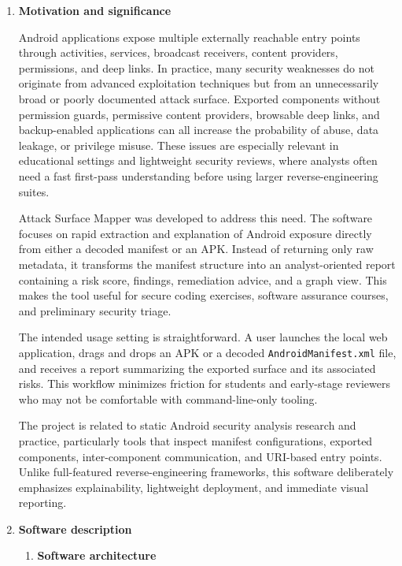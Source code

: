 \documentclass[preprint,12pt,a4paper]{elsarticle}
\begin{document}
\begin{enumerate}

\item \textbf{Motivation and significance}

Android applications expose multiple externally reachable entry points through activities, services, broadcast receivers, content providers, permissions, and deep links. In practice, many security weaknesses do not originate from advanced exploitation techniques but from an unnecessarily broad or poorly documented attack surface. Exported components without permission guards, permissive content providers, browsable deep links, and backup-enabled applications can all increase the probability of abuse, data leakage, or privilege misuse. These issues are especially relevant in educational settings and lightweight security reviews, where analysts often need a fast first-pass understanding before using larger reverse-engineering suites.

Attack Surface Mapper was developed to address this need. The software focuses on rapid extraction and explanation of Android exposure directly from either a decoded manifest or an APK. Instead of returning only raw metadata, it transforms the manifest structure into an analyst-oriented report containing a risk score, findings, remediation advice, and a graph view. This makes the tool useful for secure coding exercises, software assurance courses, and preliminary security triage.

The intended usage setting is straightforward. A user launches the local web application, drags and drops an APK or a decoded \texttt{AndroidManifest.xml} file, and receives a report summarizing the exported surface and its associated risks. This workflow minimizes friction for students and early-stage reviewers who may not be comfortable with command-line-only tooling.

The project is related to static Android security analysis research and practice, particularly tools that inspect manifest configurations, exported components, inter-component communication, and URI-based entry points. Unlike full-featured reverse-engineering frameworks, this software deliberately emphasizes explainability, lightweight deployment, and immediate visual reporting.

\item \textbf{Software description}

\begin{enumerate}
    \item \textbf{Software architecture}


\end{enumerate}
\end{enumerate}
\end{document}
